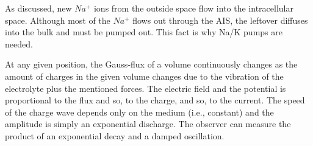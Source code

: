 \documentclass[]{article}
\begin{document}
As discussed, new $Na^+$ ions from the outside space flow into
the intracellular space. Although most of the $Na^+$ flows out through the AIS, the leftover diffuses into the bulk and must be pumped out.
This fact is why Na/K pumps are needed.

At any given position,
the Gauss-flux of a volume continuously changes as the amount of
charges in the given volume changes due to the vibration of the electrolyte plus the mentioned forces. The electric field and
the potential is proportional to the flux and so, to the charge, and so, to the current.
The speed of the charge wave
depends only on the medium (i.e., constant) and
the amplitude is simply an exponential discharge.
The observer can measure the product of an exponential decay and a
damped oscillation. 
\end{document}
